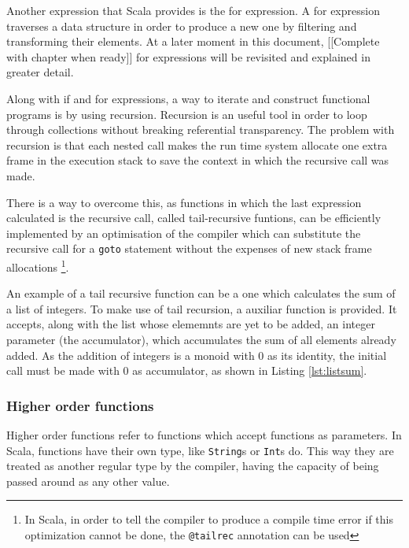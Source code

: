 \documentclass[../main.tex]{subfiles}
\begin{document}
Another expression that Scala provides is the for expression. A for expression
traverses a data structure in order to produce a new one by filtering and
transforming their elements. At a later moment in this document, [[Complete
with chapter when ready]] for expressions will be revisited and explained in
greater detail.

Along with if and for expressions, a way to iterate and construct
functional programs is by using recursion. Recursion is an useful tool in order
to loop through collections without breaking referential transparency. The
problem with recursion is that each nested call makes the run time system allocate one
extra frame in the execution stack to save the context in which the recursive call was
made.

There is a way to overcome this, as functions in which the last expression
calculated is the recursive call, called tail-recursive funtions, can be efficiently
implemented by an optimisation of the compiler which can substitute the
recursive call for a \texttt{goto} statement without the expenses of new stack
frame allocations \autocite{Steele1977DebunkingGoto} \footnote{In Scala, in order
to tell the compiler to produce a compile time error if this optimization cannot be done, the
\texttt{@tailrec} annotation can be
used\autocite{ScalaScala.annotation.tailrec}}.

An example of a tail recursive function can be a one which calculates the sum of a list of integers. To
make use of tail recursion, a auxiliar function is provided. It accepts, along with the list whose elememnts are yet to
be added, an integer parameter (the accumulator), which accumulates the sum of all elements already added. As the addition
of integers is a monoid with 0 as its identity, the initial call must be made with 0 as accumulator, as shown in
Listing \ref{lst:listsum}.




\subsubsection{Higher order functions} Higher order functions refer to functions
which accept functions as parameters. In Scala, functions have their own type,
like \texttt{String}s or \texttt{Int}s do. This way they are treated as another
regular type by the compiler, having the capacity of being passed around as any
other value.
\end{document}
